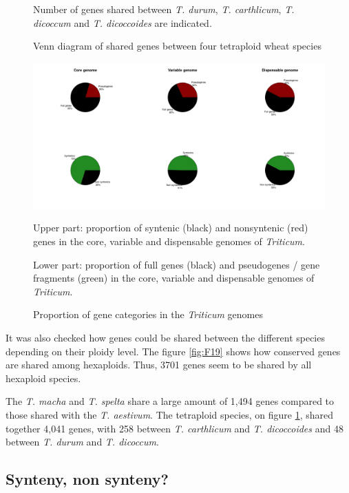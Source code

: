 \documentclass[a4paper, 12pt]{article}
\begin{document}
\begin{onehalfspace}
\begin{figure}
      \vspace{0.3cm}
      \caption{Venn diagram of shared genes between four tetraploid wheat species} 
      \label{fig:F20}
    \footnotesize{Number of genes shared between \textit{T. durum}, \textit{T. carthlicum}, \textit{T. dicoccum} and \textit{T. dicoccoides} are indicated.}
    \end{figure}
    \begin{figure}
    \vspace{-1.2cm}
      \centering \includegraphics[scale=0.28]{Figures/Figure_21.jpg}
      \caption{Proportion of gene categories in the \textit{Triticum} genomes} 
      \label{fig:F21}
    \footnotesize{Upper part: proportion of syntenic (black) and nonsyntenic (red) genes in the core, variable and dispensable genomes of \textit{Triticum}.
    
    Lower part: proportion of full genes (black) and pseudogenes / gene fragments (green) in the core, variable and dispensable genomes of \textit{Triticum}.}
    \end{figure}
\addtocounter{page}{-1}
\newpage
\clearpage 

It was also checked how genes could be shared between the different species depending on their ploidy level. The figure \ref{fig:F19} shows how  conserved genes are shared among hexaploids. Thus, 3701 genes seem to be shared by all hexaploid species. 

The \textit{T. macha} and \textit{T. spelta} share a large amount of 1,494 genes compared to those shared with the \textit{T. aestivum}. The tetraploid species, on figure \ref{fig:F20}, shared together 4,041 genes, with 258 between \textit{T. carthlicum} and \textit{T. dicoccoides} and 48 between \textit{T. durum} and \textit{T. dicoccum}.

        \subsection{Synteny, non synteny?}
        

\end{onehalfspace}
\end{document}
